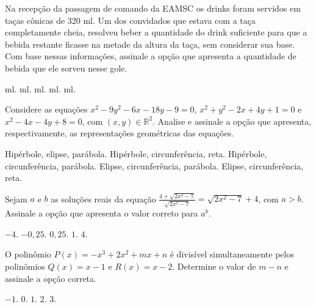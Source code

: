 \begin{question}%
Na recepção da passagem de comando da EAMSC os drinks foram servidos em taças cônicas de 320 ml. Um dos convidados que estava com a taça completamente cheia, resolveu beber a quantidade do drink suficiente para que a bebida restante ficasse na metade da altura da taça, sem considerar sua base. Com base nessas informações, assinale a opção que apresenta a quantidade de bebida que ele sorveu nesse gole.
    \begin{tasks}
         ml.
         ml.
         ml.
         ml.
         ml.
    \end{tasks}
\end{question}

\begin{question}%
Considere as equações \(x^2 - 9y^2 - 6x - 18y - 9 = 0\), \(x^2 + y^2 - 2x + 4y + 1 = 0\) e \(x^2 -4x - 4y + 8 = 0\), com \((x,y) \in \mathbb{R}^2\). Analise e assinale a opção que apresenta, respectivamente, as representações geométricas das equações.
    \begin{tasks}
        \task Hipérbole, elipse, parábola.
        \task Hipérbole, circunferência, reta.
        \task Hipérbole, circunferência, parábola.
        \task Elipse, circunferência, parábola.
        \task Elipse, circunferência, reta.
    \end{tasks}
\end{question}

\begin{question}%
Sejam \(a\) e \(b\) as soluções reais da equação
\(\frac{4 + \sqrt{2x^2 - 7}}{\sqrt{2x^2-7}} = \sqrt{2x^2 - 7} + 4\), com \(a > b\).
\\
Assinale a opção que apresenta o valor correto para \(a^b\).
    \begin{tasks}
        \task \(-4\).
        \task \(-0,25 \).
        \task \( 0,25\).
        \task \( 1\).
        \task \( 4\).
    \end{tasks}
\end{question}

\begin{question}%
O polinômio \(P(x) = -x^3 + 2x^2 + mx + n\) é divisível simultaneamente pelos polinômios \(Q(x) = x - 1\) e \(R(x) = x-2\). Determine o valor de \(m-n\) e assinale a opção correta.
    \begin{tasks}
        \task \(-1 \).
        \task \( 0\).
        \task \( 1\).
        \task \( 2\).
        \task \( 3\).
    \end{tasks}
\end{question}

